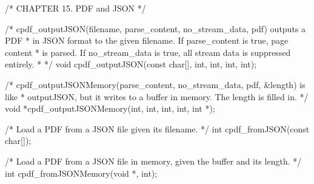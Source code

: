 /* CHAPTER 15. PDF and JSON */

/* cpdf_outputJSON(filename, parse_content, no_stream_data, pdf) outputs a PDF
 * in JSON format to the given filename. If parse_content is true, page content
 * is parsed. If no_stream_data is true, all stream data is suppressed entirely.
 * */
void cpdf_outputJSON(const char[], int, int, int, int);

/* cpdf_outputJSONMemory(parse_content, no_stream_data, pdf, &length) is like
 * outputJSON, but it writes to a buffer in memory. The length is filled in. */
void *cpdf_outputJSONMemory(int, int, int, int, int *);

/* Load a PDF from a JSON file given its filename. */
int cpdf_fromJSON(const char[]);

/* Load a PDF from a JSON file in memory, given the buffer and its length. */
int cpdf_fromJSONMemory(void *, int);

